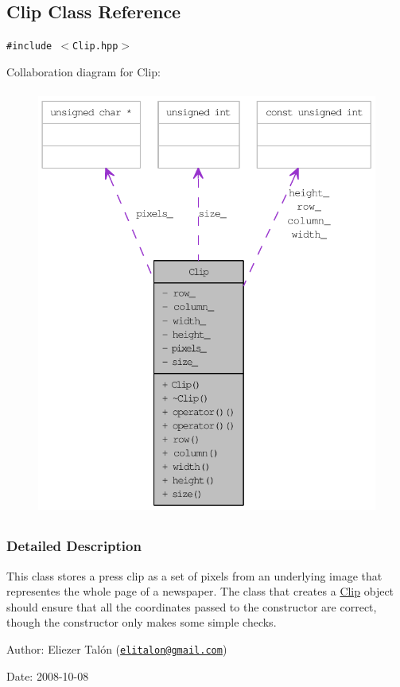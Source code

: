 \hypertarget{class_clip}{
\subsection{Clip Class Reference}
\label{class_clip}
}
{\tt \#include $<$Clip.hpp$>$}

Collaboration diagram for Clip:\nopagebreak
\begin{figure}[H]
\begin{center}
\leavevmode
\includegraphics[height=400pt]{class_clip__coll__graph}
\end{center}
\end{figure}


\subsubsection{Detailed Description}
This class stores a press clip as a set of pixels from an underlying image that representes the whole page of a newspaper. The class that creates a \hyperlink{class_clip}{Clip} object should ensure that all the coordinates passed to the constructor are correct, though the constructor only makes some simple checks.

\begin{Desc}
\item[Author:]Eliezer Talón (\href{mailto:elitalon@gmail.com}{\tt elitalon@gmail.com}) \end{Desc}
\begin{Desc}
\item[Date:]2008-10-08 \end{Desc}
